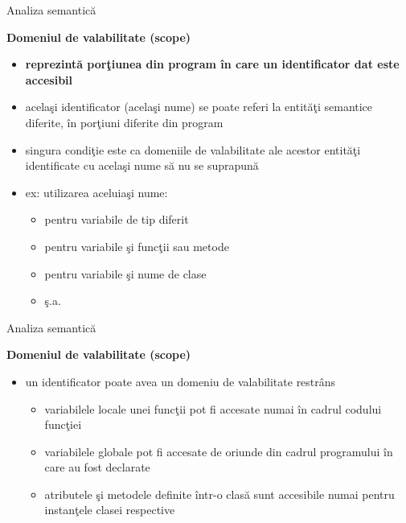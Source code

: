 \documentclass[pdf]{beamer}
\begin{document}
\begin{frame}{Analiza semantică}

\textbf{Domeniul de valabilitate (scope)}

\begin{itemize}
\item
\textbf{reprezintă porţiunea din program în care un identificator dat este accesibil}

\item
acelaşi identificator (acelaşi nume) se poate referi la entităţi semantice diferite, în porţiuni diferite din program

\item
singura condiţie este ca domeniile de valabilitate ale acestor entităţi identificate cu acelaşi nume să nu se suprapună

\item
ex: utilizarea aceluiaşi nume: 
\begin{itemize}
\item
pentru variabile de tip diferit
\item
pentru variabile şi funcţii sau metode
\item
pentru variabile şi nume de clase
\item
ş.a.
\end{itemize}
\end{itemize}
\end{frame}



\begin{frame}{Analiza semantică}

\textbf{Domeniul de valabilitate (scope)}

\begin{itemize}
\item
un identificator poate avea un domeniu de valabilitate restrâns

\begin{itemize}
\item
variabilele locale unei funcţii pot fi accesate numai în cadrul codului funcţiei

\item
variabilele globale pot fi accesate de oriunde din cadrul programului în care au fost declarate

\item
atributele şi metodele definite într-o clasă sunt accesibile numai pentru instanţele clasei respective
\end{itemize}
\end{itemize}
\end{frame}
\end{document}
